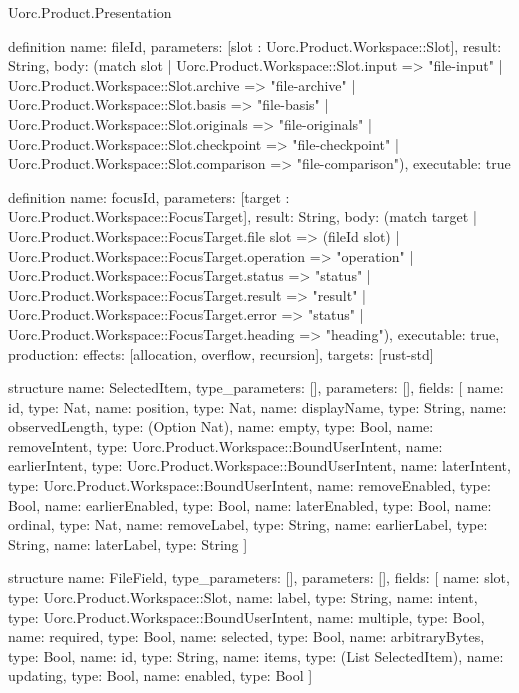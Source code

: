 \begin{lexlean}{Uorc.Product.Presentation}
\begin{semanticmodule}
definition{
  name: fileId,
  parameters: [slot : Uorc.Product.Workspace::Slot],
  result: String,
  body: (match slot
    | Uorc.Product.Workspace::Slot.input => "file-input"
    | Uorc.Product.Workspace::Slot.archive => "file-archive"
    | Uorc.Product.Workspace::Slot.basis => "file-basis"
    | Uorc.Product.Workspace::Slot.originals => "file-originals"
    | Uorc.Product.Workspace::Slot.checkpoint => "file-checkpoint"
    | Uorc.Product.Workspace::Slot.comparison => "file-comparison"),
  executable: true
}

definition{
  name: focusId,
  parameters: [target : Uorc.Product.Workspace::FocusTarget],
  result: String,
  body: (match target
    | Uorc.Product.Workspace::FocusTarget.file slot => (fileId slot)
    | Uorc.Product.Workspace::FocusTarget.operation => "operation"
    | Uorc.Product.Workspace::FocusTarget.status => "status"
    | Uorc.Product.Workspace::FocusTarget.result => "result"
    | Uorc.Product.Workspace::FocusTarget.error => "status"
    | Uorc.Product.Workspace::FocusTarget.heading => "heading"),
  executable: true,
  production: {effects: [allocation, overflow, recursion], targets: [rust-std]}
}

structure{
  name: SelectedItem,
  type_parameters: [],
  parameters: [],
  fields: [
    {name: id, type: Nat},
    {name: position, type: Nat},
    {name: displayName, type: String},
    {name: observedLength, type: (Option Nat)},
    {name: empty, type: Bool},
    {name: removeIntent, type: Uorc.Product.Workspace::BoundUserIntent},
    {name: earlierIntent, type: Uorc.Product.Workspace::BoundUserIntent},
    {name: laterIntent, type: Uorc.Product.Workspace::BoundUserIntent},
    {name: removeEnabled, type: Bool},
    {name: earlierEnabled, type: Bool},
    {name: laterEnabled, type: Bool},
    {name: ordinal, type: Nat},
    {name: removeLabel, type: String},
    {name: earlierLabel, type: String},
    {name: laterLabel, type: String}
  ]
}

structure{
  name: FileField,
  type_parameters: [],
  parameters: [],
  fields: [
    {name: slot, type: Uorc.Product.Workspace::Slot},
    {name: label, type: String},
    {name: intent, type: Uorc.Product.Workspace::BoundUserIntent},
    {name: multiple, type: Bool},
    {name: required, type: Bool},
    {name: selected, type: Bool},
    {name: arbitraryBytes, type: Bool},
    {name: id, type: String},
    {name: items, type: (List SelectedItem)},
    {name: updating, type: Bool},
    {name: enabled, type: Bool}
  ]
}


\end{semanticmodule}
\end{lexlean}
